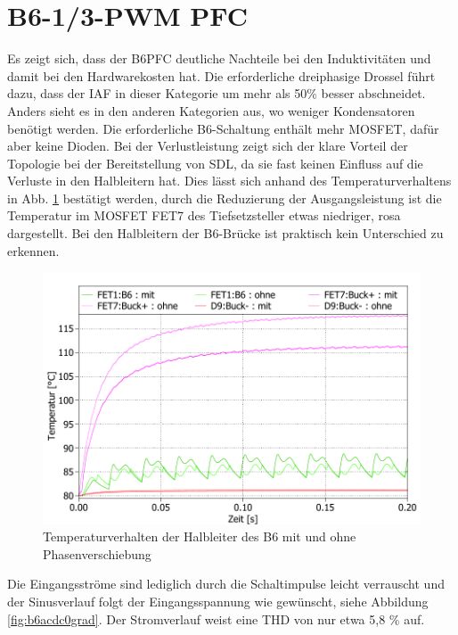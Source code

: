 \section{B6-1/3-PWM PFC}
Es zeigt sich, dass der \gls{B6PFC} deutliche Nachteile bei den Induktivitäten und damit bei den Hardwarekosten hat. Die erforderliche dreiphasige Drossel führt dazu, dass der IAF in dieser Kategorie um mehr als 50\% besser abschneidet.
Anders sieht es in den anderen Kategorien aus, wo weniger Kondensatoren benötigt werden. Die erforderliche B6-Schaltung enthält mehr \gls{MOSFET}, dafür aber keine Dioden. Bei der Verlustleistung zeigt sich der klare Vorteil der Topologie bei der Bereitstellung von \gls{SDL}, da sie fast keinen Einfluss auf die Verluste in den Halbleitern hat. Dies lässt sich anhand des Temperaturverhaltens in Abb. \ref{fig:b6temp030grad} bestätigt werden, durch die Reduzierung der Ausgangsleistung ist die Temperatur im  \gls{MOSFET} FET7 des Tiefsetzsteller etwas niedriger, rosa dargestellt. Bei den Halbleitern der B6-Brücke ist praktisch kein Unterschied zu erkennen.
\begin{figure}
	\centering
	\includegraphics[width=1\linewidth]{content/Grafiken/B6_Temp_0&30Grad}
	\caption{Temperaturverhalten der Halbleiter des B6 mit und ohne Phasenverschiebung}
	\label{fig:b6temp030grad}
\end{figure}
Die Eingangsströme sind lediglich durch die Schaltimpulse leicht verrauscht und der Sinusverlauf folgt der Eingangsspannung wie gewünscht, siehe Abbildung \ref{fig:b6acdc0grad}.  Der Stromverlauf weist eine THD von nur etwa 5,8 \% auf. 

